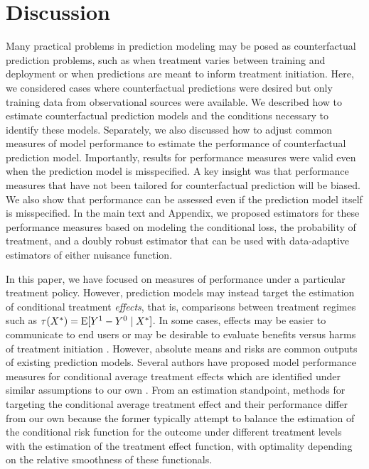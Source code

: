 \section{Discussion} \label{sec:discussion}

Many practical problems in prediction modeling may be posed as counterfactual prediction problems, such as when treatment varies between training and deployment or when predictions are meant to inform treatment initiation. Here, we considered cases where counterfactual predictions were desired but only training data from observational sources were available. We described how to estimate counterfactual prediction models and the conditions necessary to identify these models. Separately, we also discussed how to adjust common measures of model performance to estimate the performance of counterfactual prediction model. Importantly, results for performance measures were valid even when the prediction model is misspecified. A key insight was that performance measures that have not been tailored for counterfactual prediction will be biased. We also show that performance can be assessed even if the prediction model itself is misspecified. In the main text and Appendix, we proposed estimators for these performance measures based on modeling the conditional loss, the probability of treatment, and a doubly robust estimator that can be used with data-adaptive estimators of either nuisance function. 

In this paper, we have focused on measures of performance under a particular treatment policy. However, prediction models may instead target the estimation of conditional treatment \textit{effects}, that is, comparisons between treatment regimes such as $\tau(X^*) = \operatorname{E}[Y^1 - Y^0 \mid X^*]$. In some cases, effects may be easier to communicate to end users or may be desirable to evaluate benefits versus harms of treatment initiation \cite{kent_predictive_2020}. However, absolute means and risks are common outputs of existing prediction models. Several authors have proposed model performance measures for conditional average treatment effects which are identified under similar assumptions to our own \cite{schuler_comparison_2018, rolling2014model, xu_calibration_2022, van2003unified, alaa_validating_2019}. From an estimation standpoint, methods for targeting the conditional average treatment effect and their performance differ from our own because the former typically attempt to balance the estimation of the conditional risk function for the outcome under different treatment levels with the estimation of the treatment effect function, with optimality depending on the relative smoothness of these functionals.

